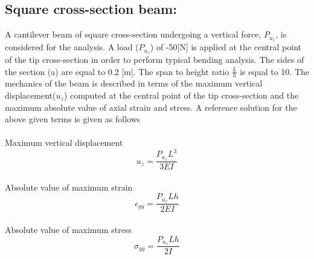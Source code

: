 \documentclass[a4paper,12pt]{article}
\begin{document}
\subsection*{Square cross-section beam:}
\indent\indent\indent\indent A cantilever beam of square cross-section undergoing a vertical force, $P_{u_{z}}$, is considered for the analysis. A load ($P_{u_{z}}$) of -50[N] is applied at the central point of the tip cross-section in order to perform typical bending analysis. The sides of the section (a) are equal to 0.2 [m]. The span to height ratio $\frac{L}{h}$ is equal to 10. The mechanics of the beam is described in terms of the maximum vertical displacement($u_{z}$) computed at the central point of the tip cross-section and the maximum absolute value of axial strain and stress. A reference solution for the above given terms is given as follows\\
\\
Maximum vertical displacement 
\begin{equation}
u_{z} = \frac{P_{u_{z}} L^{3}}{3 E I}
\label{u_z}
\end{equation}
\\
Absolute value of maximum strain
\begin{equation}
\epsilon_{yy} = \frac{P_{u_{z}} L h}{2 E I}
\label{eyy}
\end{equation}
\\
Absolute value of maximum stress
\begin{equation}
\sigma_{yy} = \frac{P_{u_{z}} L h}{2 I}
\label{syy}
\end{equation}
\end{document}
